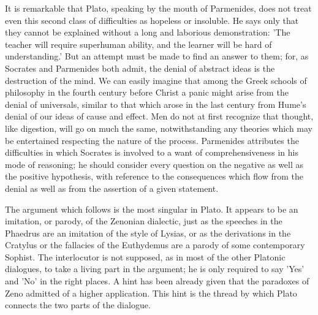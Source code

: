 It is remarkable that Plato, speaking by the mouth of Parmenides,
does not treat even this second class of difficulties as hopeless or
insoluble. He says only that they cannot be explained without a long and
laborious demonstration: 'The teacher will require superhuman ability,
and the learner will be hard of understanding.' But an attempt must be
made to find an answer to them; for, as Socrates and Parmenides both
admit, the denial of abstract ideas is the destruction of the mind. We
can easily imagine that among the Greek schools of philosophy in the
fourth century before Christ a panic might arise from the denial of
universals, similar to that which arose in the last century from Hume's
denial of our ideas of cause and effect. Men do not at first recognize
that thought, like digestion, will go on much the same, notwithstanding
any theories which may be entertained respecting the nature of the
process. Parmenides attributes the difficulties in which Socrates is
involved to a want of comprehensiveness in his mode of reasoning; he
should consider every question on the negative as well as the positive
hypothesis, with reference to the consequences which flow from the
denial as well as from the assertion of a given statement.

The argument which follows is the most singular in Plato. It appears
to be an imitation, or parody, of the Zenonian dialectic, just as the
speeches in the Phaedrus are an imitation of the style of Lysias, or as
the derivations in the Cratylus or the fallacies of the Euthydemus are
a parody of some contemporary Sophist. The interlocutor is not supposed,
as in most of the other Platonic dialogues, to take a living part in the
argument; he is only required to say 'Yes' and 'No' in the right places.
A hint has been already given that the paradoxes of Zeno admitted of a
higher application. This hint is the thread by which Plato connects the
two parts of the dialogue.

